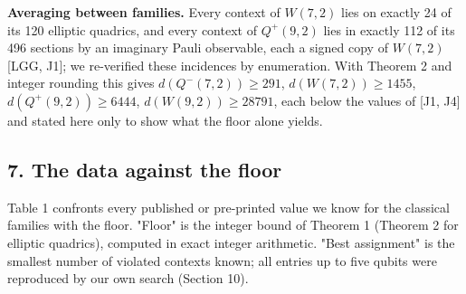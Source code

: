 \documentclass[11pt,a4paper]{article}
\begin{document}
\textbf{Averaging between families.} Every context of \(W(7,2)\) lies on exactly 24 of its 120 elliptic
quadrics, and every context of \(Q^+(9,2)\) lies in exactly 112 of its 496 sections by an imaginary Pauli
observable, each a signed copy of \(W(7,2)\) {[}LGG, J1{]}; we re-verified these incidences by enumeration.
With Theorem 2 and integer rounding this gives \(d(Q^-(7,2)) \ge 291\), \(d(W(7,2)) \ge 1455\),
\(d(Q^+(9,2)) \ge 6444\), \(d(W(9,2)) \ge 28791\), each below the values of {[}J1, J4{]} and stated here only to
show what the floor alone yields.

\subsection{7. The data against the floor}\label{7-the-data-against-the-floor}

Table 1 confronts every published or pre-printed value we know for the classical families with the
floor. "Floor" is the integer bound of Theorem 1 (Theorem 2 for elliptic quadrics), computed in exact
integer arithmetic. "Best assignment" is the smallest number of violated contexts known; all entries up
to five qubits were reproduced by our own search (Section 10).
\end{document}

